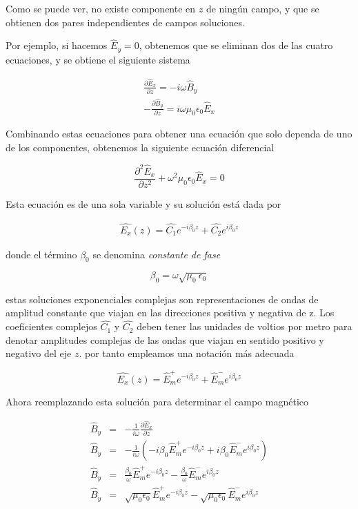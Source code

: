Como se puede ver, no existe componente en $z$ de ningún campo, y que se obtienen dos pares independientes de campos soluciones. 

Por ejemplo, si hacemos $\hat{E}_y = 0$, obtenemos que se eliminan dos de las cuatro ecuaciones, y se obtiene el siguiente sistema

\begin{eqnarray*}
\frac{\partial \hat{E}_x}{\partial z} = - i \omega \hat{B}_y \\
-\frac{\partial \hat{B}_y}{\partial z} = i \omega \mu_0\epsilon_0 \hat{E}_x 
\end{eqnarray*}


Combinando estas ecuaciones para obtener una ecuación que solo dependa de uno de los componentes, obtenemos la siguiente ecuación diferencial


\begin{equation*}
\frac{\partial^2 \hat{E}_x}{\partial z^2} + \omega^2 \mu_0\epsilon_0 \hat{E}_x = 0
\end{equation*}

Esta ecuación es de una sola variable y su solución está dada por

\begin{eqnarray*}
\hat{E_x}(z) = \hat{C_1} e^{-i \beta_0 z} + \hat{C_2} e^{i \beta_0 z}
\end{eqnarray*}

donde el término $\beta_0$ se denomina \textit{constante de fase}

\begin{equation*}
\beta_0 = \omega \sqrt{\mu_0 \ \epsilon_0 }
\end{equation*}

estas soluciones exponenciales complejas son representaciones de ondas de amplitud constante que viajan en las direcciones positiva y negativa de z. Los coeficientes complejos $ \hat{C_1}$ y $ \hat{C_2}$ deben tener las unidades de voltios por metro para denotar amplitudes complejas de las ondas que viajan en sentido positivo y negativo del eje $z$. por tanto empleamos una notación más adecuada

\begin{equation*}
\hat{E_x} (z) = \hat{E}_m^+ e^{-i \beta_0 z} + \hat{E}_m^- e^{i \beta_0 z}
\end{equation*}

Ahora reemplazando esta solución para determinar el campo magnético

\begin{eqnarray*}
\hat{B}_y &=& -\frac{1}{i \omega} \frac{\partial \hat{E}_x}{\partial z} \\
\hat{B}_y &=& -\frac{1}{i \omega} (- i \beta_0 \hat{E}_m^+ e^{-i \beta_0 z} + i \beta_0 \hat{E}_m^- e^{i \beta_0 z}) \\
\hat{B}_y &=& \frac{\beta_0}{\omega} \hat{E}_m^+ e^{-i \beta_0 z} - \frac{\beta_0}{\omega} \hat{E}_m^- e^{i \beta_0 z} \\
\hat{B}_y &=& \sqrt{\mu_0\epsilon_0} \hat{E}_m^+ e^{-i \beta_0 z} - \sqrt{\mu_0\epsilon_0} \hat{E}_m^- e^{i \beta_0 z}
\end{eqnarray*}

